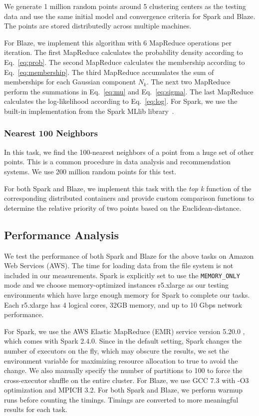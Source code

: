 We generate 1 million random points around 5 clustering centers as the testing data and use the same initial model and convergence criteria for Spark and Blaze.
The points are stored distributedly across multiple machines.

For Blaze, we implement this algorithm with 6 MapReduce operations per iteration.
The first MapReduce calculates the probability density according to Eq.~\ref{eq:prob}.
The second MapReduce calculates the membership according to Eq.~\ref{eq:membership}.
The third MapReduce accumulates the sum of memberships for each Gaussian component $N_k$.
The next two MapReduce perform the summations in Eq.~\ref{eq:mu} and Eq.~\ref{eq:sigma}.
The last MapReduce calculates the log-likelihood according to Eq.~\ref{eq:log}.
For Spark, we use the built-in implementation from the Spark MLlib library~\cite{meng2016mllib}.

\subsubsection{Nearest 100 Neighbors}

In this task, we find the 100-nearest neighbors of a point from a huge set of other points.
This is a common procedure in data analysis and recommendation systems.
We use 200 million random points for this test.

For both Spark and Blaze, we implement this task with the \emph{top k} function of the corresponding distributed containers and provide custom comparison functions to determine the relative priority of two points based on the Euclidean-distance.

\subsection{Performance Analysis}

We test the performance of both Spark and Blaze for the above tasks on Amazon Web Services (AWS).
The time for loading data from the file system is not included in our measurements.
Spark is explicitly set to use the \lstinline{MEMORY_ONLY} mode and we choose memory-optimized instances r5.xlarge as our testing environments which have large enough memory for Spark to complete our tasks.
Each r5.xlarge has 4 logical cores, 32GB memory, and up to 10 Gbps network performance.

For Spark, we use the AWS Elastic MapReduce (EMR) service version 5.20.0 , which comes with Spark 2.4.0.
Since in the default setting, Spark changes the number of executors on the fly, which may obscure the results, we set the environment variable for maximizing resource allocation to true to avoid the change.
We also manually specify the number of partitions to 100 to force the cross-executor shuffle on the entire cluster.
For Blaze, we use GCC 7.3 with -O3 optimization and MPICH 3.2. 
For both Spark and Blaze, we perform warmup runs before counting the timings.
Timings are converted to more meaningful results for each task.

